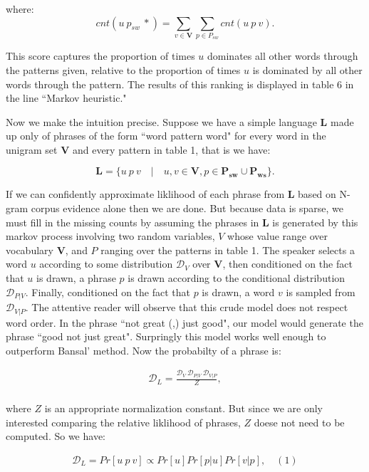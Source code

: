 where:
\[cnt( u \: p_{sw} \: *) = \sum_{v \in \mathbf{V}} \sum_{p \in P_{sw}} cnt( u \: p \: v).\]

This score captures the proportion of times $u$ dominates all other words through the patterns given, relative to the proportion of times $u$ is dominated by all other words through the pattern. The results of this ranking is displayed in table 6 in the line ``Markov heuristic."

Now we make the intuition precise. Suppose we have a simple language $\mathbf{L}$ made up only of phrases of the form ``word pattern word" for every word in the unigram set $\mathbf{V}$ and every pattern in table 1, that is we have:

\[ \mathbf{L} = \{ u \: p \: v \quad|\quad u,v \in \mathbf{V}, p \in \mathbf{P_{sw}} \cup \mathbf{P_{ws}} \}. \]

If we can confidently approximate liklihood of each phrase from $\mathbf{L}$ based on N-gram corpus evidence alone then we are done. But because data is sparse, we must fill in the missing counts by assuming the phrases in $\mathbf{L}$ is generated by this markov process involving two random variables, $V$ whose value range over vocabulary $\mathbf{V}$, and $P$ ranging over the patterns in table 1. The speaker selects a word $u$ according to some distribution $\mathcal{D}_{V}$ over $\mathbf{V}$,  then conditioned on the fact that $u$ is drawn, a phrase $p$ is drawn according to the conditional distribution $\mathcal{D}_{P|V}$. Finally, conditioned on the fact that $p$ is drawn, a word $v$ is sampled from $\mathcal{D}_{V|P}$. The attentive reader will observe that this crude model does not respect word order. In the phrase ``not great (,) just good", our model would generate the phrase ``good not just great". Surpringly this model works well enough to outperform Bansal' method. Now the probabilty of a phrase is:

\begin{align*}
\mathcal{D}_L = \frac{\mathcal{D}_{V} \: \mathcal{D}_{P|V} \: \mathcal{D}_{V|P}}{Z},\\
\end{align*}

where $Z$ is an appropriate normalization constant. But since we are only interested comparing the relative liklihood of phrases, $Z$ doese not need to be computed. So we have:

\begin{align*}
\mathcal{D}_L = Pr[u \: p \: v] \propto Pr[u] Pr[p | u] Pr[v | p], \quad (1)
\end{align*}

